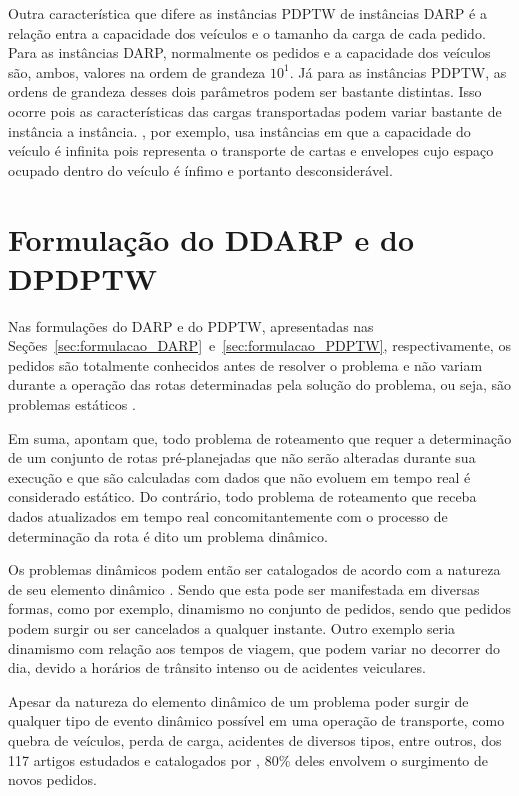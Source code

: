 Outra característica que difere as instâncias PDPTW de instâncias DARP é a
relação entra a capacidade dos veículos e o tamanho da carga de cada pedido.
Para as instâncias DARP, normalmente os pedidos e a capacidade dos veículos 
são, ambos, valores na ordem de grandeza $10^1$.
Já para as instâncias PDPTW, as ordens de grandeza desses dois parâmetros podem
ser bastante distintas.
Isso ocorre pois as características das cargas transportadas podem variar
bastante de instância a instância.
\textcite{gendreau_neighborhood_2006}, por exemplo, usa instâncias em que a
capacidade do veículo é infinita pois representa o transporte de cartas e
envelopes cujo espaço ocupado dentro do veículo é ínfimo e portanto 
desconsiderável.
\fi

\section{Formulação do DDARP e do DPDPTW}

Nas formulações do DARP e do PDPTW, apresentadas nas
Seções~\ref{sec:formulacao_DARP}~e~\ref{sec:formulacao_PDPTW}, respectivamente,
os pedidos são totalmente conhecidos antes de resolver o problema e não variam 
durante a operação das rotas determinadas pela solução do problema, ou seja, 
são problemas estáticos \cite{psaraftis_dynamic_1988}.

Em suma, \textcite{psaraftis_dynamic_2015} apontam que, 
todo problema de roteamento que requer a determinação de um conjunto
de rotas pré-planejadas que não serão alteradas durante sua execução e que 
são calculadas com dados que não evoluem em tempo real é considerado estático.
Do contrário, todo problema de roteamento que receba dados atualizados em tempo
real concomitantemente com o processo de determinação da rota é dito um
problema dinâmico. 

Os problemas dinâmicos podem então ser catalogados de acordo com a natureza de
seu elemento dinâmico \cite{psaraftis_dynamic_2015}.
Sendo que esta pode ser manifestada em diversas formas, como por exemplo,
dinamismo no conjunto de pedidos, sendo que pedidos podem surgir ou ser
cancelados a qualquer instante.
Outro exemplo seria dinamismo com relação aos tempos de viagem, que podem
variar no decorrer do dia, devido a horários de trânsito intenso ou de
acidentes veiculares.

Apesar da natureza do elemento dinâmico de um problema poder surgir de qualquer
tipo de evento dinâmico possível em uma operação de transporte, como quebra de
veículos, perda de carga, acidentes de diversos tipos, entre outros, dos 117
artigos estudados e catalogados por  \textcite{psaraftis_dynamic_2015}, 80\%
deles envolvem o surgimento de novos pedidos.

